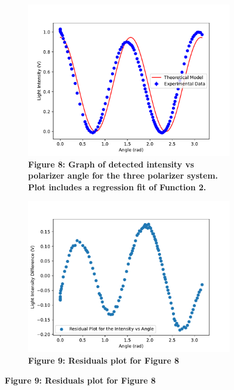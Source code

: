 \documentclass[
	letterpaper, %
	10pt, %
]{CSUniSchoolLabReport}
\begin{document}
\begin{figure}[H]
	\begin{subfigure}[t]{0.45\textwidth}
		\centering
		\includegraphics[width=\textwidth]{../figures/figure8.pdf}
		\caption{\textbf{Figure 8: Graph of detected intensity vs polarizer angle for the three polarizer system. Plot includes a regression fit of Function 2. }}
	\end{subfigure}
	\hfill
	\begin{subfigure}[t]{0.45\textwidth}
		\includegraphics[width=\textwidth]{../figures/figure9.pdf}
		\caption{\textbf{Figure 9: Residuals plot for Figure 8}}
	\end{subfigure}
\end{figure}
\end{document}
